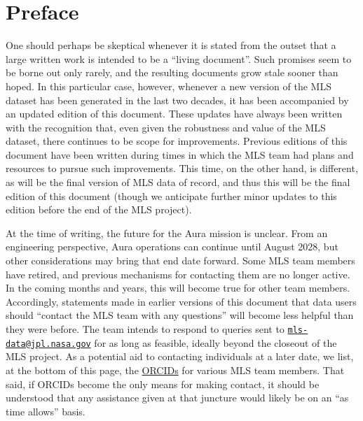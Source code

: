 \chapter*{Preface}
\label{chap:Preface}

One should perhaps be skeptical whenever it is stated from the outset that a large written work is intended to be a ``living document''.  Such promises seem to be borne out only rarely, and the resulting documents grow stale sooner than hoped.   In this particular case, however, whenever a new version of the MLS dataset has been generated in the last two decades, it has been accompanied by an updated edition of this document.  These updates have always been written with the recognition that, even given the robustness and value of the MLS dataset, there continues to be scope for improvements.  Previous editions of this document have been written during times in which the MLS team had plans and resources to pursue such improvements.  This time, on the other hand, is different, as \thisv will be the final version of MLS data of record, and thus this will be the final edition of this document (though we anticipate further minor updates to this edition before the end of the MLS project). 

At the time of writing, the future for the Aura mission is unclear.  From an engineering perspective, Aura operations can continue until August 2028, but other considerations may bring that end date forward.  Some MLS team members have retired, and previous mechanisms for contacting them are no longer active.  In the coming months and years, this will become true for other team members.  Accordingly, statements made in earlier versions of this document that data users should ``contact the MLS team with any questions'' will become less helpful than they were before.  The team intends to respond to queries sent to \href{mailto:mls-data@jpl.nasa.gov}{\texttt{mls-data@jpl.nasa.gov}} for as long as feasible, ideally beyond the closeout of the MLS project.  As a potential aid to contacting individuals at a later date, we list, at the bottom of this page, the \href{https://orcid.org/}{ORCIDs} for various MLS team members. That said, if ORCIDs become the only means for making contact, it should be understood that any assistance given at that juncture would likely be on an ``as time allows'' basis.

